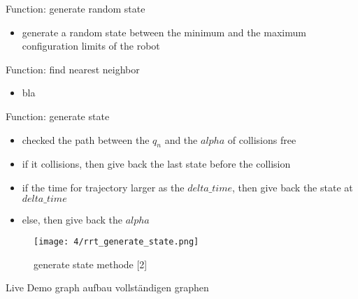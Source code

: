 \documentclass[%
  professionalfonts,%
  xcolor={%
    usenames,%
    dvipsnames,%
    svgnames,%
    table,%
    hyperref%
  }%
]{beamer}
\begin{document}
      \begin{frame}{Function: generate random state}
        \begin{itemize}
          \item generate a random state between the minimum and the maximum configuration limits of the robot
        \end{itemize}
        
      \end{frame}
      
      \begin{frame}{Function: find nearest neighbor}
        \begin{itemize}
          \item bla
        \end{itemize}
      \end{frame}
      
      \begin{frame}{Function: generate state}
        \begin{itemize}
          \item checked the path between the $q_n$ and the $alpha$ of collisions free
          \item if it collisions, then give back the last state before the collision
          \item if the time for trajectory larger as the $delta\_time$, then give back the state at $delta\_time$
          \item else, then give back the $alpha$
        \end{itemize}
        
        \begin{figure}[h]
          \texttt{[image: 4/rrt\_generate\_state.png]}
          \caption{generate state methode [2]}
          \label{fig:generate state methode}
        \end{figure}
      \end{frame}
      
      \begin{frame}{Live Demo}
        graph aufbau 
        vollständigen graphen
      \end{frame}
        
\end{document}
